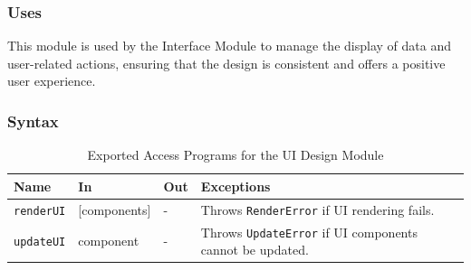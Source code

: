 \documentclass[12pt, titlepage]{article}
\begin{document}
\subsubsection{Uses}
This module is used by the Interface Module to manage the display of data and
user-related actions, ensuring that the design is consistent and offers a
positive user experience.

\subsubsection{Syntax}
\begin{description}
  \item[Exported Constants and Access Programs:]
  \item
  \begin{table}[h!]
    \centering
    \begin{tabular}{p{} p{} p{} p{}}
    \toprule
    \textbf{Name} & \textbf{In} & \textbf{Out} & \textbf{Exceptions}\\
    \midrule
    \texttt{renderUI} & [components] & - & Throws \texttt{RenderError} if UI rendering fails.\\
    \midrule
    \texttt{updateUI} & component & - & Throws \texttt{UpdateError} if UI components cannot be updated.\\
    \bottomrule
    \end{tabular}
    \caption{Exported Access Programs for the UI Design Module}
    \label{TblEAP_UI}
  \end{table}
\end{description}
\end{document}
